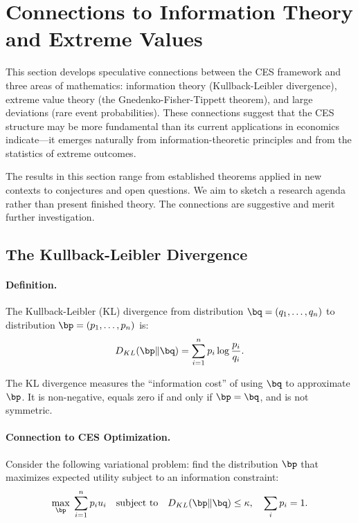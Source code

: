 \section{Connections to Information Theory and Extreme Values}
\label{sec:ac-advanced}

This section develops speculative connections between the CES framework and three areas of mathematics: information theory (Kullback-Leibler divergence), extreme value theory (the Gnedenko-Fisher-Tippett theorem), and large deviations (rare event probabilities). These connections suggest that the CES structure may be more fundamental than its current applications in economics indicate---it emerges naturally from information-theoretic principles and from the statistics of extreme outcomes.

\begin{calloutcaution}
The results in this section range from established theorems applied in new contexts to conjectures and open questions. We aim to sketch a research agenda rather than present finished theory. The connections are suggestive and merit further investigation.
\end{calloutcaution}

\subsection{The Kullback-Leibler Divergence}
\label{subsec:ac-adv-kl}

\paragraph{Definition.}
The Kullback-Leibler (KL) divergence from distribution $\bq = (q_1, \ldots, q_n)$ to distribution $\bp = (p_1, \ldots, p_n)$ is:
\begin{equation}
D_{KL}(\bp \| \bq) = \sum_{i=1}^{n} p_i \log \frac{p_i}{q_i}.
\label{eq:ac-adv-kl-def}
\end{equation}

The KL divergence measures the ``information cost'' of using $\bq$ to approximate $\bp$. It is non-negative, equals zero if and only if $\bp = \bq$, and is not symmetric.

\paragraph{Connection to CES Optimization.}
Consider the following variational problem: find the distribution $\bp$ that maximizes expected utility subject to an information constraint:
\begin{equation}
\max_{\bp} \; \sum_{i=1}^{n} p_i u_i \quad \text{subject to} \quad D_{KL}(\bp \| \bq) \leq \kappa, \quad \sum_i p_i = 1.
\label{eq:ac-adv-kl-problem}
\end{equation}

